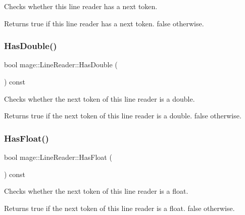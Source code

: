 Checks whether this line reader has a next token.

\begin{DoxyReturn}{Returns}
{\ttfamily true} if this line reader has a next token. {\ttfamily false} otherwise. 
\end{DoxyReturn}
\hypertarget{classmage_1_1_line_reader_ad6eb5eaf990bba426498d11c53bd31cd}{}\label{classmage_1_1_line_reader_ad6eb5eaf990bba426498d11c53bd31cd} 
\subsubsection{\texorpdfstring{Has\+Double()}{HasDouble()}}
{\footnotesize\ttfamily bool mage\+::\+Line\+Reader\+::\+Has\+Double (\begin{DoxyParamCaption}{ }\end{DoxyParamCaption}) const\hspace{0.3cm}{\ttfamily [protected]}}

Checks whether the next token of this line reader is a {\ttfamily double}.

\begin{DoxyReturn}{Returns}
{\ttfamily true} if the next token of this line reader is a {\ttfamily double}. {\ttfamily false} otherwise. 
\end{DoxyReturn}
\hypertarget{classmage_1_1_line_reader_ade0b6d83fc8cd6a4c64b2c97b9ff0bda}{}\label{classmage_1_1_line_reader_ade0b6d83fc8cd6a4c64b2c97b9ff0bda} 
\subsubsection{\texorpdfstring{Has\+Float()}{HasFloat()}}
{\footnotesize\ttfamily bool mage\+::\+Line\+Reader\+::\+Has\+Float (\begin{DoxyParamCaption}{ }\end{DoxyParamCaption}) const\hspace{0.3cm}{\ttfamily [protected]}}

Checks whether the next token of this line reader is a {\ttfamily float}.

\begin{DoxyReturn}{Returns}
{\ttfamily true} if the next token of this line reader is a {\ttfamily float}. {\ttfamily false} otherwise. 
\end{DoxyReturn}
\hypertarget{classmage_1_1_line_reader_a36b83e0adfa48d9226ae59c23df8f44a}{}\label{classmage_1_1_line_reader_a36b83e0adfa48d9226ae59c23df8f44a} 
